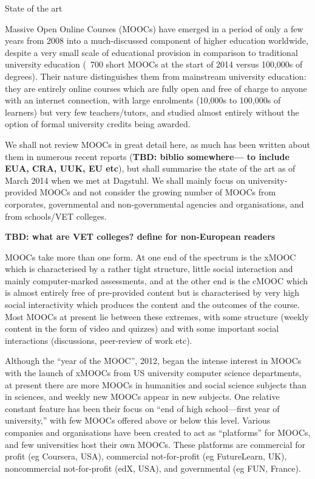 State of the art

Massive Open Online Courses (MOOCs) have emerged in a period of only a
few years from 2008 into a much-discussed component of higher education
worldwide, despite a very small scale of educational provision in
comparison to traditional university education (~700 short MOOCs at the
start of 2014 versus 100,000s of degrees).  Their nature distinguishes
them from mainstream university education: they are entirely online
courses which are fully open and free of charge to anyone with an
internet connection, with large enrolments (10,000s to 100,000s of
learners) but very few teachers/tutors, and studied almost entirely
without the option of formal university credits being awarded.

We shall not review MOOCs in great detail here, as much has been written
about them in numerous recent reports (\textbf{TBD: biblio somewhere---
to include EUA, CRA, UUK, EU etc}), but shall summarise the state of
the art as of March 2014 when we met at Dagstuhl.
We shall mainly focus on university-provided MOOCs and not consider
the growing number of MOOCs from corporates, governmental and
non-governmental agencies and organisations, and from schools/VET
colleges.

\textbf{TBD: what are VET colleges?  define for non-European readers}

MOOCs take more than one form.  At one end of the spectrum is the xMOOC
which is characterised by a rather tight structure, little social
interaction and mainly computer-marked assessments, and at the other end
is the cMOOC which is almost entirely free of pre-provided content but
is characterised by very high social interactivity which produces the
content and the outcomes of the course.  Most MOOCs at present lie
between these extremes, with some structure (weekly content in the form
of video and quizzes) and with some important social interactions
(discussions, peer-review of work etc).

Although the ``year of the MOOC'', 2012, began the intense interest in
MOOCs with the launch of xMOOCs from US university computer science
departments, at present there are more MOOCs in humanities and social
science subjects than in sciences, and weekly new MOOCs appear in new
subjects.  One relative constant feature has been their focus on ``end of
high school---first year of university,'' with few MOOCs offered above or
below this level.  Various companies and organisations have been created
to act as   ``platforms'' for MOOCs, and few universities host their own
MOOCs. These platforms are commercial for profit (eg Coursera, USA),
commercial not-for-profit (eg FutureLearn, UK), noncommercial
not-for-profit (edX, USA), and governmental (eg FUN, France).

